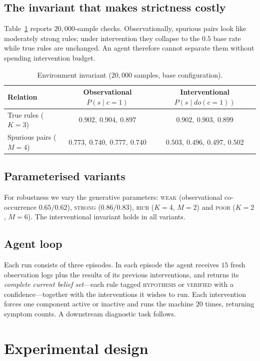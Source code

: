 \documentclass[11pt]{article}
\begin{document}
\subsection{The invariant that makes strictness costly}
Table~\ref{tab:invariant} reports $20{,}000$-sample checks. Observationally, spurious pairs
look like moderately strong rules; under intervention they collapse to the $0.5$ base rate
while true rules are unchanged. An agent therefore cannot separate them without spending
intervention budget.

\begin{table}[t]\centering
\caption{Environment invariant ($20{,}000$ samples, base configuration).}
\label{tab:invariant}
\begin{tabular}{lcc}
\toprule
Relation & Observational $P(s\mid c{=}1)$ & Interventional $P(s\mid do(c{=}1))$\\
\midrule
True rules ($K{=}3$)      & $0.902,\ 0.904,\ 0.897$ & $0.902,\ 0.903,\ 0.899$\\
Spurious pairs ($M{=}4$)  & $0.773,\ 0.740,\ 0.777,\ 0.740$ & $0.503,\ 0.496,\ 0.497,\ 0.502$\\
\bottomrule
\end{tabular}
\end{table}

\subsection{Parameterised variants}
For robustness we vary the generative parameters: \textsc{weak} (observational
co-occurrence $0.65/0.62$), \textsc{strong} ($0.86/0.83$), \textsc{rich} ($K{=}4$, $M{=}2$)
and \textsc{poor} ($K{=}2$, $M{=}6$). The interventional invariant holds in all variants.

\subsection{Agent loop}
Each run consists of three episodes. In each episode the agent receives $15$ fresh
observation logs plus the results of its previous interventions, and returns its
\emph{complete current belief set}---each rule tagged \textsc{hypothesis} or
\textsc{verified} with a confidence---together with the interventions it wishes to run.
Each intervention forces one component active or inactive and runs the machine $20$ times,
returning symptom counts. A downstream diagnostic task follows.

\section{Experimental design}
\end{document}
